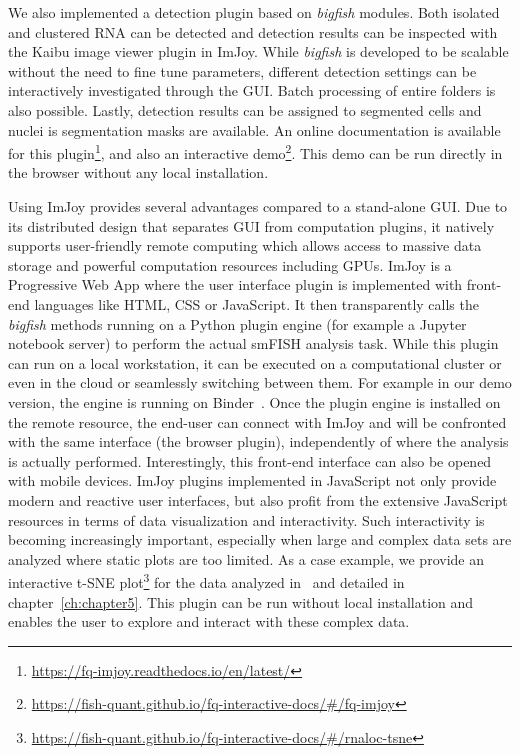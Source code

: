 We also implemented a detection plugin based on \emph{bigfish} modules.
Both isolated and clustered \ac{RNA} can be detected and detection results can be inspected with the Kaibu image viewer plugin in ImJoy.
While \emph{bigfish} is developed to be scalable without the need to fine tune parameters, different detection settings can be interactively investigated through the \ac{GUI}.
Batch processing of entire folders is also possible.
Lastly, detection results can be assigned to segmented cells and nuclei is segmentation masks are available.
An online documentation is available for this plugin\footnote{\url{https://fq-imjoy.readthedocs.io/en/latest/}}, and also an interactive demo\footnote{\url{https://fish-quant.github.io/fq-interactive-docs/\#/fq-imjoy}}.
This demo can be run directly in the browser without any local installation.

Using ImJoy provides several advantages compared to a stand-alone \ac{GUI}.
Due to its distributed design that separates \ac{GUI} from computation plugins, it natively supports user-friendly remote computing which allows access to massive data storage and powerful computation resources including GPUs.
ImJoy is a Progressive Web App where the user interface plugin is implemented with front-end languages like HTML, CSS or JavaScript.
It then transparently calls the \emph{bigfish} methods running on a Python plugin engine (for example a Jupyter notebook server) to perform the actual \ac{smFISH} analysis task.
While this plugin can run on a local workstation, it can be executed on a computational cluster or even in the cloud or seamlessly switching between them.
For example in our demo version, the engine is running on Binder~\cite{Jupyter2018Binder2}.
Once the plugin engine is installed on the remote resource, the end-user can connect with ImJoy and will be confronted with the same interface (the browser plugin), independently of where the analysis is actually performed.
Interestingly, this front-end interface can also be opened with mobile devices.
ImJoy plugins implemented in JavaScript not only provide modern and reactive user interfaces, but also profit from the extensive JavaScript resources in terms of data visualization and interactivity.
Such interactivity is becoming increasingly important, especially when large and complex data sets are analyzed where static plots are too limited.
As a case example, we provide an interactive t-SNE plot\footnote{\url{https://fish-quant.github.io/fq-interactive-docs/\#/rnaloc-tsne}} for the data analyzed in~\cite{CHOUAIB_2020} and detailed in chapter~\ref{ch:chapter5}.
This plugin can be run without local installation and enables the user to explore and interact with these complex data.


